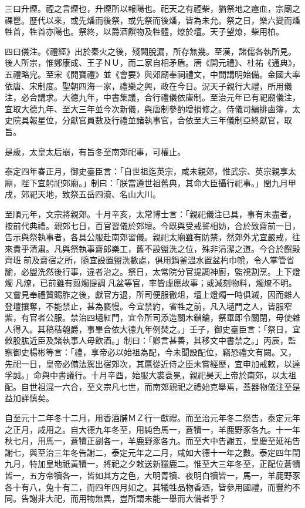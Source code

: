 \begin{pinyinscope}
 三曰升煙。禋之言煙也，升煙所以報陽也。祀天之有禋柴，猶祭地之瘞血，宗廟之祼鬯。歷代以來，或先燔而後祭，或先祭而後燔，皆為未允。祭之日，樂六變而燔牲首，牲首亦陽也。祭終，以爵酒饌物及牲體，燎於壇。天子望燎，柴用柏。



 四曰儀注。《禮經》出於秦火之後，殘闕脫漏，所存無幾。至漢，諸儒各執所見。後人所宗，惟鄭康成、王子ＮＵ，而二家自相矛盾。唐《開元禮》、杜祐《通典》，五禮略完。至宋《開寶禮》並《會要》與郊廟奉祠禮文，中間講明始備。金國大率依唐、宋制度。聖朝四海一家，禮樂之興，政在今日。況天子親行大禮，所用儀注，必合講求。大德九年，中書集議，合行禮儀依唐制。至治元年已有祀廟儀注，宜取大德九年、至大三年並今次新儀，與唐制參酌增損修之。侍儀司編排鹵簿，太史院具報星位，分獻官員數及行禮並諸執事官，合依至大三年儀制亞終獻官，取旨。



 是歲，太皇太后崩，有旨冬至南郊祀事，可權止。



 泰定四年春正月，御史臺臣言：「自世祖迄英宗，咸未親郊，惟武宗、英宗親享太廟，陛下宜躬祀郊廟。」制曰：「朕當遵世祖舊典，其命大臣攝行祀事。」閏九月甲戌，郊祀天地，致祭五岳四瀆、名山大川。



 至順元年，文宗將親郊。十月辛亥，太常博士言：「親祀儀注已具，事有未盡者，按前代典禮。親郊七日，百官習儀於郊壇。今既與受戒誓相妨，合於致齋前一日，告示與祭執事者，各具公服赴南郊習儀。親祀太廟雖有防禁，然郊外尤宜嚴戒，往來貴乎清肅。凡與祭執事齋郎樂工，舊不設盥洗之位，殊非涓潔之道。今合於饌殿齊班前及齋宿之所，隨宜設置盥洗數處，俱用鍋釜溫水置盆杓巾帨，令人掌管省諭，必盥洗然後行事，違者治之。祭日，太常院分官提調神廚，監視割烹。上下燈燭凡燎，已前雖有翦燭提調凡盆等官，率皆虛應故事；或減刻物料，燭燎不明。又嘗見奉禮贊賜胙之後，獻官方退，所司便服徹俎，壇上燈燭一時俱滅，因而雜人登壇攘奪，不能禁止，甚為褻慢。今宜禁約，省牲之前，凡入壝門之人，皆服窄紫，有官者公服。禁治四壝紅門，宜令所司添造關木鎖鑰，祭畢即令關閉，毋使雜人得入。其稿秸匏爵，事畢合依大德九年例焚之。」壬子，御史臺臣言：「祭日，宜敕股肱近臣及諸執事人毋飲酒。」制曰：「卿言甚善，其移文中書禁之。」丙辰，監察御史楊彬等言：「禮，享帝必以始祖為配，今未聞設配位，竊恐禮文有闕。又，先祀一日，皇帝必備法駕出宿郊次，其扈從近侍之臣未嘗經歷，宜申加戒敕，以達孚誠。」命與中書議行。十月辛酉，始服大裘袞冕，親祀昊天上帝於南郊，以太祖配。自世祖混一六合，至文宗凡七世，而南郊親祀之禮始克舉焉，蓋器物儀注至是益加詳慎矣。



 自至元十二年冬十二月，用香酒脯ＭＺ行一獻禮。而至治元年冬二祭告，泰定元年之正月，咸用之。自大德九年冬至，用純色馬一，蒼犢一，羊鹿野豕各九。十一年秋七月，用馬一，蒼犢正副各一，羊鹿野豕各九。而至大中告謝五，皇慶至延祐告謝七，與至治三年冬告謝二，泰定元年之二月，咸如大德十一年之數。泰定四年閏九月，特加皇地祇黃犢一，將祀之夕敕送新獵鹿二。惟至大三年冬至，正配位蒼犢皆一，五方帝犢各一，皆如其方之色，大明青犢、夜明白犢皆一，馬一，羊鹿野豕各十有八，兔十有二，而四年四月如之。其犧牲品物香酒，皆參用國禮，而豐約不同。告謝非大祀，而用物無異，豈所謂未能一舉而大備者乎？




\end{pinyinscope}
